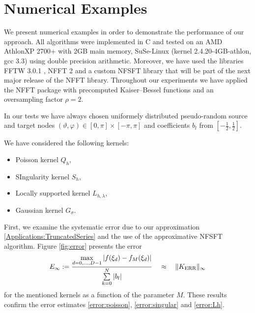 \documentclass[11pt,a4paper,twoside,bibtotoc]{scrartcl}
\theoremstyle{plain}
\theoremstyle{definition}
\theoremstyle{remark}
\newcommand{\fun}[2]{\ensuremath{#1{\hspace{-0.4ex}}\left(#2\right)}}
\newcommand{\paren}[1]{\ensuremath{\left(#1\right)}}
\numberwithin{equation}{section}
\numberwithin{table}{section}
\numberwithin{figure}{section}
\begin{document}
\section{Numerical Examples}

We present numerical examples in order to demonstrate the performance of
our approach. All algorithms were implemented in C and tested on an 
AMD Athlon\texttrademark XP 2700+ with 2GB main memory, SuSe-Linux 
(kernel 2.4.20-4GB-athlon, gcc 3.3) using double precision arithmetic. 
Moreover, we have used the libraries FFTW 3.0.1 \cite{fftw}, NFFT 2
\cite{kupo02C} and a custom NFSFT library that will be part of the next 
major release of the NFFT library. Throughout our experiments we have 
applied the NFFT package \cite{kupo02C} with precomputed Kaiser--Bessel 
functions and an oversampling factor $\rho=2$.

In our tests we have always chosen uniformely distributed pseudo-random 
source and target nodes 
$\paren{\vartheta,\varphi} \in [0,\pi] \times [-\pi,\pi]$ and 
coefficients $b_l$ from $\left[-\frac{1}{2},\frac{1}{2}\right]$.

We have considered the following kernels:

\begin{itemize}
  \item Poisson kernel $Q_{h}$,
  \item SIngularity kernel $S_{h}$,
  \item Locally supported kernel $L_{h,\lambda}$,
  \item Gaussian kernel $G_{\sigma}$.
\end{itemize}


First, we examine the systematic error due to our approximation 
\eqref{Applications:TruncatedSeries} and the use of the 
approximative NFSFT algorithm. Figure \ref{fig:error} presents 
the error
\[
  E_{\infty}:=
  \frac{\max\limits_{d=0,\ldots,D-1}\left|\fun{f}{\xi_{d}}-
  \fun{f_{M}}{\xi_{d}}\right|}{\sum\limits_{k=0}^N 
  |b_l|} \quad \approx \quad \|K_{\text{ERR}}\|_{\infty}
\]
for the mentioned kernels as a function of the parameter $M$.
These results confirm the error estimates \eqref{error:poisson},
\eqref{error:singular} and \eqref{error:Lh}.
\end{document}
